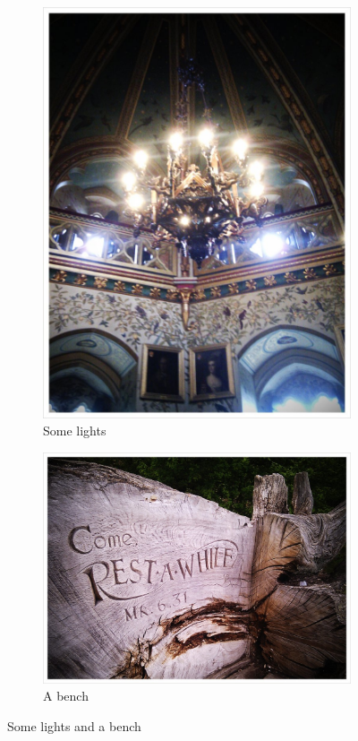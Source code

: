 \documentclass[12pt,twoside,a4paper]{article}
\begin{document}
	\begin{figure}[htb]
	    \centering
	    \begin{subfigure}[b]{0.3\textwidth}
	        \includegraphics[width=\textwidth]{img/lights}
	        \caption{Some lights}
	        \label{fig:lights}
	    \end{subfigure}
	    \begin{subfigure}[b]{0.3\textwidth}
	        \includegraphics[width=\textwidth]{img/bench}
	        \caption{A bench}
	        \label{fig:bench}
	    \end{subfigure}
	    \caption{Some lights and a bench}
	    \label{fig:subfigexample}
	\end{figure}
	
\end{document}

